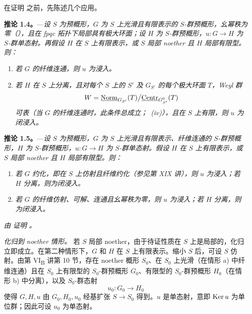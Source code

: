 在证明  之前，先陈述几个应用。

\medskip
\noindent{}%
\textbf{推论 1.4。}---\textit{设 \(S\) 为预概形，\(G\) 为 \(S\) 上光滑且有限表示的 \(S\)-群预概形，幺幂秩为零（），且在 fpqc 拓扑下局部具有极大环面；设 \(H\) 为 \(S\)-群预概形，\(u:G\to H\) 为 \(S\)-群单态射。再假设 \(H\) 在 \(S\) 上有限表示，或 \(S\) 局部 noether 且 \(H\) 局部有限型。则：}
\begin{enumerate}
\item[\textit{a)}] \textit{若 \(G\) 的纤维连通，则 \(u\) 为浸入。}
\item[\textit{b)}] \textit{若 \(H\) 在 \(S\) 上分离，且对每个 \(S\) 上的 \(S'\) 及 \(G_{S'}\) 的每个极大环面 \(T\)，Weyl 群}
\[
  W=
  \underline{\operatorname{Norm}}_{G_{S'}}(T)\big/\underline{\operatorname{Centr}}_{G_{S'}^0}(T)
\]
\textit{可表（当 \(G\) 的纤维连通时，此条件总成立；~(iv)），且在 \(S\) 上有限，则 \(u\) 为闭浸入。}
\end{enumerate}

\medskip
\noindent{}%
\textbf{推论 1.5。}---\textit{设 \(S\) 为预概形，\(G\) 为 \(S\) 上光滑且有限表示、纤维连通的 \(S\)-群预概形，\(H\) 为 \(S\)-群预概形，\(u:G\to H\) 为 \(S\)-群单态射。假设 \(H\) 在 \(S\) 上有限表示，或 \(S\) 局部 noether 且 \(H\) 局部有限型。则：}
\begin{enumerate}
\item[\textit{a)}] \textit{若 \(G\) 约化，即在 \(S\) 上仿射且纤维约化（参见第 XIX 讲），则 \(u\) 为浸入；若 \(H\) 分离，则为闭浸入。}
\item[\textit{b)}] \textit{若 \(G\) 的纤维仿射、可解、连通且幺幂秩为零，则 \(u\) 为浸入；若 \(H\) 分离，则为闭浸入。}
\end{enumerate}

\medskip
\noindent\textit{由  证明 。}

\smallskip
\noindent\textit{化归到 noether 情形。}
若 \(S\) 局部 noether，由于待证性质在 \(S\) 上是局部的，化归立即成立。在第二种情形下，\(G\) 和 \(H\) 在 \(S\) 上有限表示。缩小 \(S\) 后，可设 \(S\) 仿射。由第 VI\textsubscript{B} 讲第 10 节，存在 noether 概形 \(S_0\)、在 \(S_0\) 上光滑（在情形 a) 中纤维连通）且在 \(S_0\) 上有限型的 \(S_0\)-群预概形 \(G_0\)、有限型的 \(S_0\)-群预概形 \(H_0\)（在情形 b) 中分离），以及 \(S_0\)-群态射
\[
  u_0:G_0\longrightarrow H_0
\]
使得 \(G,H,u\) 由 \(G_0,H_0,u_0\) 经基扩张 \(S\to S_0\) 得到。\(u\) 是单态射，意即 \(\operatorname{Ker} u\) 为单位群；因此可设 \(u_0\) 为单态射。

